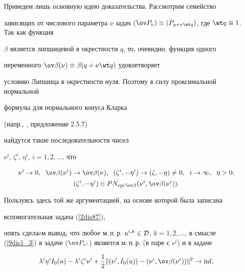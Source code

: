 \begin{pf}


Приведем лишь основную идею доказательства. Рассмотрим семейство


зависящих от числового параметра $\nu$ задач $(\ov


P_\nu)\equiv(P_{q+\nu\wt q})$, где $\wt q\equiv 1$. Так как функция


$\beta$ является липшицевой в окрестности $q$, то, очевидно, функция одного


переменного $\ov\beta(\nu) \equiv\beta(q+\nu\wt q)$ удовлетворяет


условию Липшица в окрестности нуля. Поэтому в силу проксимальной нормальной


формулы для нормального конуса Кларка


(напр., \cite{clarke}, предложение 2.5.7)


найдутся такие последовательности чисел


$\nu^i$, $\zeta^i$, $\eta^i$, $i=1,2,\dotsc$, что


\begin{gather*}


\nu^i\to 0,\ \; \ov\beta(\nu^i)\to\ov\beta(\nu),\ \;


(\zeta^i,-\eta^i)\to(\zeta,-\eta)\neq 0,\ \;


i\to\infty,\ \; \eta>0, \\


%


(\zeta^i,-\eta^i)\in PN_{\epi \ov\beta}(\nu^i,\ov


\beta(\nu^i)).


\end{gather*}


Пользуясь здесь той же аргументацией, на основе которой была записана


вспомогательная задача (\ref{2dis87}),


опять сделаeм вывод, что любое м.\,п.\,р. $u^{i,k}\in{\cal


D}$, $k=1,2,\dotsc$, в смысле (\ref{9dis1_3}) в задаче ($\ov


P_{\nu^i}$) является м.\,п.\,р. (в паре с $\nu^i$) и в задаче


\begin{gather}


\label{9dis1_23}


\lambda^i\eta^iI_0(u)-\lambda^i\zeta^i\nu'+


\frac 12\|(\nu',I_0(u))-(\nu^i,\ov\beta(\nu^i))\|^2\to\inf, \\



\end{gather}
\end{pf}
